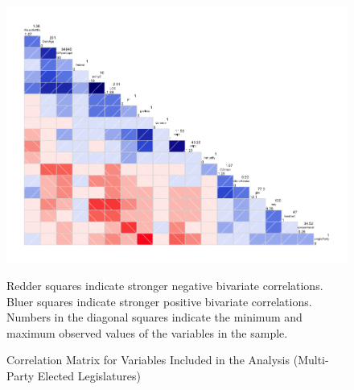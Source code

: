 \documentclass[a4paper]{article}\usepackage{graphicx, color}
\begin{document}
\begin{landscape}
\begin{figure}[t]
    \caption{Correlation Matrix for Variables Included in the Analysis (Multi-Party Elected Legislatures)}
    \label{corrmatrix}
    \begin{center}
    
    \includegraphics[width = \textwidth]{figure/corScatter.png}  






    \end{center}
    \begin{singlespace}
        {\scriptsize{Redder squares indicate stronger negative bivariate correlations. \\
        Bluer squares indicate stronger positive bivariate correlations. \\
        Numbers in the diagonal squares indicate the minimum and maximum observed values of the variables in the sample.
        }}
    \end{singlespace} 
\end{figure}
\end{landscape}

\end{document}
